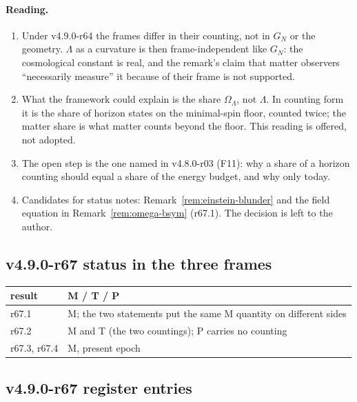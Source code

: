\paragraph{Reading.}
\begin{enumerate}[leftmargin=2em]
\item Under v4.9.0-r64 the frames differ in their counting, not in \(G_N\) or the geometry.  \(\Lambda\) as a curvature is then frame-independent like \(G_N\):
the cosmological constant is real, and the remark's claim that matter observers ``necessarily measure'' it because of their frame is not supported.
\item What the framework could explain is the share \(\Omega_\Lambda\), not \(\Lambda\).  In counting form it is the share of horizon states on the minimal-spin
floor, counted twice; the matter share is what matter counts beyond the floor.  This reading is offered, not adopted.
\item The open step is the one named in v4.8.0-r03 (F11): why a share of a horizon counting should equal a share of the energy budget, and why only today.
\item Candidates for status notes: Remark~\ref{rem:einstein-blunder} and the field equation in Remark~\ref{rem:omega-bsym} (r67.1).  The decision is left to
the author.
\end{enumerate}

\subsection*{v4.9.0-r67 status in the three frames}
\label{subsec:v490-r67-frames}

\begin{center}
\small
\begin{tabular}{@{}>{\raggedright\arraybackslash}p{}>{\raggedright\arraybackslash}p{}@{}}
\toprule
result & M / T / P\\
\midrule
r67.1 & M; the two statements put the same M quantity on different sides\\
r67.2 & M and T (the two countings); P carries no counting\\
r67.3, r67.4 & M, present epoch\\
\bottomrule
\end{tabular}
\end{center}

\subsection*{v4.9.0-r67 register entries}
\label{subsec:v490-r67-register}

